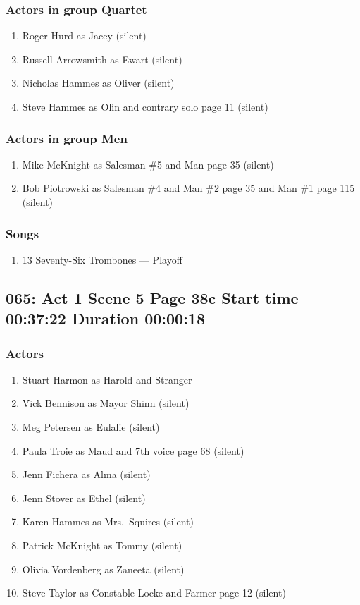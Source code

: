 \subsubsection{Actors in group Quartet}
\begin{enumerate}
\item Roger Hurd as Jacey (silent)
\item Russell Arrowsmith as Ewart (silent)
\item Nicholas Hammes as Oliver (silent)
\item Steve Hammes as Olin and contrary solo page 11 (silent)
\end{enumerate}
\subsubsection{Actors in group Men}
\begin{enumerate}
\item Mike McKnight as Salesman \#5 and Man page 35 (silent)
\item Bob Piotrowski as Salesman \#4 and Man \#2 page 35 and Man \#1 page 115 (silent)
\end{enumerate}

\subsubsection{Songs}
\begin{enumerate}
\item 13 Seventy-Six Trombones --- Playoff
\end{enumerate}
\subsection{065: Act 1 Scene 5 Page 38c Start time 00:37:22 Duration 00:00:18}

\subsubsection{Actors}
\begin{enumerate}
\item Stuart Harmon as Harold and Stranger
\item Vick Bennison as Mayor Shinn (silent)
\item Meg Petersen as Eulalie (silent)
\item Paula Troie as Maud and 7th voice page 68 (silent)
\item Jenn Fichera as Alma (silent)
\item Jenn Stover as Ethel (silent)
\item Karen Hammes as Mrs.~Squires (silent)
\item Patrick McKnight as Tommy (silent)
\item Olivia Vordenberg as Zaneeta (silent)
\item Steve Taylor as Constable Locke and Farmer page 12 (silent)
\end{enumerate}
